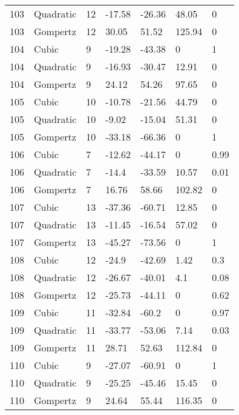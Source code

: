 \documentclass[11pt]{article}
\begin{document}
\begin{center}
\begin{longtable}{lllllll}
    103 & Quadratic & 12              & -17.58  & -26.36  & 48.05   & 0    \\
    103 & Gompertz  & 12              & 30.05   & 51.52   & 125.94  & 0    \\
    104 & Cubic     & 9               & -19.28  & -43.38  & 0       & 1    \\
    104 & Quadratic & 9               & -16.93  & -30.47  & 12.91   & 0    \\
    104 & Gompertz  & 9               & 24.12   & 54.26   & 97.65   & 0    \\
    105 & Cubic     & 10              & -10.78  & -21.56  & 44.79   & 0    \\
    105 & Quadratic & 10              & -9.02   & -15.04  & 51.31   & 0    \\
    105 & Gompertz  & 10              & -33.18  & -66.36  & 0       & 1    \\
    106 & Cubic     & 7               & -12.62  & -44.17  & 0       & 0.99 \\
    106 & Quadratic & 7               & -14.4   & -33.59  & 10.57   & 0.01 \\
    106 & Gompertz  & 7               & 16.76   & 58.66   & 102.82  & 0    \\
    107 & Cubic     & 13              & -37.36  & -60.71  & 12.85   & 0    \\
    107 & Quadratic & 13              & -11.45  & -16.54  & 57.02   & 0    \\
    107 & Gompertz  & 13              & -45.27  & -73.56  & 0       & 1    \\
    108 & Cubic     & 12              & -24.9   & -42.69  & 1.42    & 0.3  \\
    108 & Quadratic & 12              & -26.67  & -40.01  & 4.1     & 0.08 \\
    108 & Gompertz  & 12              & -25.73  & -44.11  & 0       & 0.62 \\
    109 & Cubic     & 11              & -32.84  & -60.2   & 0       & 0.97 \\
    109 & Quadratic & 11              & -33.77  & -53.06  & 7.14    & 0.03 \\
    109 & Gompertz  & 11              & 28.71   & 52.63   & 112.84  & 0    \\
    110 & Cubic     & 9               & -27.07  & -60.91  & 0       & 1    \\
    110 & Quadratic & 9               & -25.25  & -45.46  & 15.45   & 0    \\
    110 & Gompertz  & 9               & 24.64   & 55.44   & 116.35  & 0    \\

\end{longtable}
\end{center}
\end{document}
